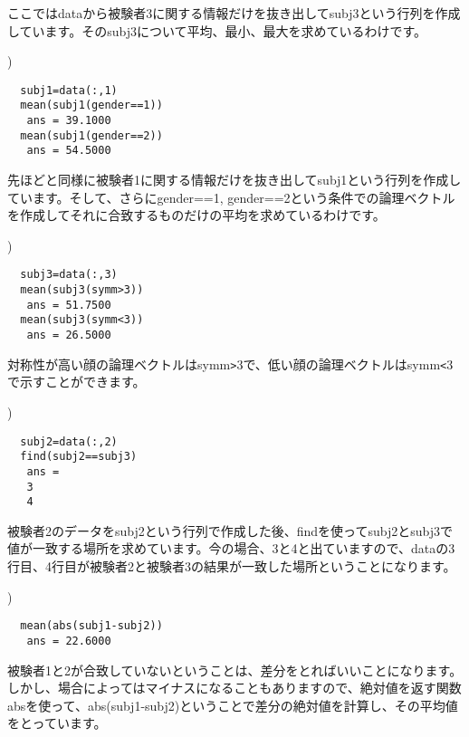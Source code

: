 \documentclass{jsarticle}
\begin{document}
\begin{screen}
ここではdataから被験者3に関する情報だけを抜き出してsubj3という行列を作成しています。そのsubj3について平均、最小、最大を求めているわけです。
\end{screen}

\bigskip

)
\begin{verbatim}
  subj1=data(:,1)
  mean(subj1(gender==1))
   ans = 39.1000
  mean(subj1(gender==2))
   ans = 54.5000
\end{verbatim}

\begin{screen}
先ほどと同様に被験者1に関する情報だけを抜き出してsubj1という行列を作成しています。そして、さらにgender==1, gender==2という条件での論理ベクトルを作成してそれに合致するものだけの平均を求めているわけです。
\end{screen}

\bigskip

)
\begin{verbatim}
  subj3=data(:,3)
  mean(subj3(symm>3))
   ans = 51.7500
  mean(subj3(symm<3))
   ans = 26.5000
\end{verbatim}

\begin{screen}
対称性が高い顔の論理ベクトルはsymm\verb|>|3で、低い顔の論理ベクトルはsymm\verb|<|3で示すことができます。
\end{screen}

\bigskip

)
\begin{verbatim}
  subj2=data(:,2)
  find(subj2==subj3)
   ans = 
   3
   4
\end{verbatim}

\begin{screen}
被験者2のデータをsubj2という行列で作成した後、findを使ってsubj2とsubj3で値が一致する場所を求めています。今の場合、3と4と出ていますので、dataの3行目、4行目が被験者2と被験者3の結果が一致した場所ということになります。
\end{screen}

\bigskip

)
\begin{verbatim}
  mean(abs(subj1-subj2))
   ans = 22.6000
\end{verbatim}

\begin{screen}
被験者1と2が合致していないということは、差分をとればいいことになります。しかし、場合によってはマイナスになることもありますので、絶対値を返す関数absを使って、abs(subj1-subj2)ということで差分の絶対値を計算し、その平均値をとっています。
\end{screen}
\end{document}
